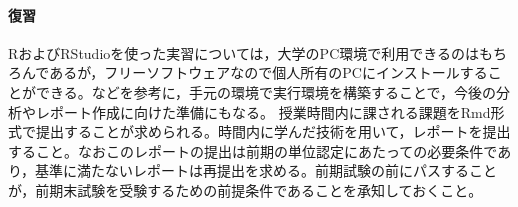 \paragraph{復習}
RおよびRStudioを使った実習については，大学のPC環境で利用できるのはもちろんであるが，フリーソフトウェアなので個人所有のPCにインストールすることができる。\citet{kosugi2019}などを参考に，手元の環境で実行環境を構築することで，今後の分析やレポート作成に向けた準備にもなる。
授業時間内に課される課題をRmd形式で提出することが求められる。時間内に学んだ技術を用いて，レポートを提出すること。なおこのレポートの提出は前期の単位認定にあたっての必要条件であり，基準に満たないレポートは再提出を求める。前期試験の前にパスすることが，前期末試験を受験するための前提条件であることを承知しておくこと。
